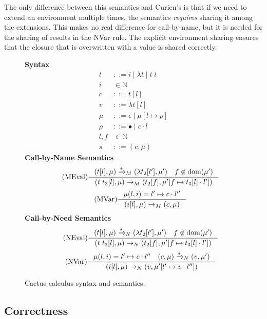 The only difference between this semantics and Curien's is that if we need
to extend an environment multiple times, the semantics \emph{requires}
sharing it among the extensions. This makes no real difference for call-by-name,
but it is needed for the sharing of results in the NVar rule. The explicit
environment sharing ensures that the closure that is overwritten with a value is
shared correctly.

\begin{figure*}
\textbf{Syntax}
\begin{align*}
\tag{Term} t &::= i \; | \; \lambda t \; | \; t \; t  \\
\tag{Variable} i &\in \mathbb{N}  \\
\tag{Closure} c &::= t [l] \\
\tag{Value} v &::= \lambda t [l] \\
\tag{Heap} \mu &::= \epsilon \; | \; \mu [ l \mapsto \rho ] \\
\tag{Environment} \rho &::= \bullet \; | \; c \cdot l \\
\tag{Location} l,f &\in \mathbb{N}  \\
\tag{State} s &::= (c, \mu)
\end{align*}
\textbf{Call-by-Name Semantics}
\begin{align*}
\tag{MEval} \inference
{(t[l], \mu) \xrightarrow{* }_{M} (\lambda t_2[l'], \mu') \quad f \not \in \textnormal{dom}(\mu')}
{(t \; t_3[l], \mu) \rightarrow_{M} (t_2[f], \mu'[f \mapsto t_3[l] \cdot l'])}  
\end{align*}
\begin{align*}
\tag{MVar} \inference 
{\mu(l, i) = l' \mapsto c \cdot l''}
{(i[l],\mu) \rightarrow_M (c,\mu)}
\end{align*}
\textbf{Call-by-Need Semantics}
\begin{align*}
\tag{NEval} \inference
{(t[l], \mu) \xrightarrow{* }_{N} (\lambda t_2[l'], \mu') \quad f \not \in \textnormal{dom}(\mu')}
{(t \; t_3[l], \mu) \rightarrow_{N} (t_2[f], \mu'[f \mapsto t_3[l] \cdot l'])}  
\end{align*}
\begin{align*}
\tag{NVar} \inference
{\mu(l, i) = l' \mapsto c \cdot l'' \quad (c, \mu) \xrightarrow{* }_{N} (v, \mu')}
{(i[l],\mu) \rightarrow_N (v, \mu'[l' \mapsto v \cdot l''])}
\end{align*}
\caption{Cactus calculus syntax and semantics.}
\label{fig:calccact}
\end{figure*}

\subsection{Correctness}

